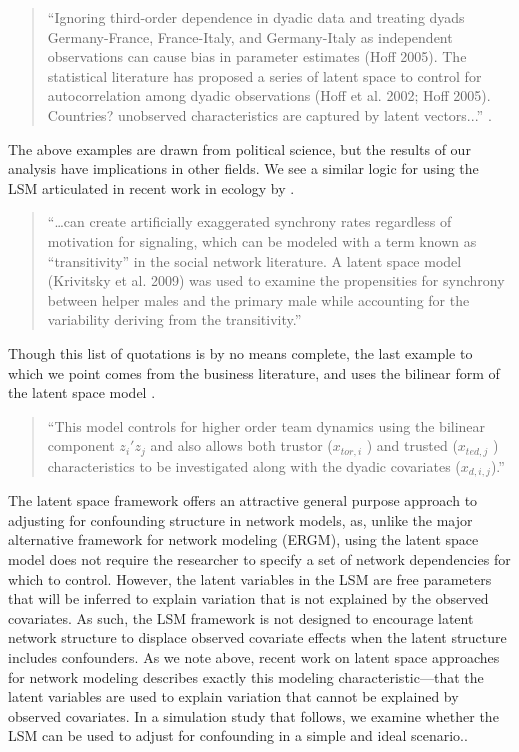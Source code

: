 \documentclass[11pt]{article}
\begin{document}
\begin{quote}
``Ignoring third-order dependence in dyadic data and treating dyads Germany-France, France-Italy, and Germany-Italy as independent observations can cause bias in parameter estimates (Hoff 2005). The statistical literature has proposed a series of latent space to control for autocorrelation among dyadic observations (Hoff et al. 2002; Hoff 2005). Countries? unobserved characteristics are captured by latent vectors...'' \citep[p. 17]{cao2016transnational}.
\end{quote}


The above examples are drawn from political science, but the results of our analysis have implications in other fields. We see a similar logic for using the LSM articulated in recent work in ecology by \citet[p. 989]{nomano2015unrelated}.

\begin{quote}
``\ldots can create artificially exaggerated synchrony rates regardless of motivation for signaling, which can be modeled with a term known as ``transitivity'' in the social network literature. A latent space model (Krivitsky et al. 2009) was used to examine the propensities for synchrony between helper males and the primary male while accounting for the variability deriving from the transitivity.''
\end{quote}


Though this list of quotations is by no means complete, the last example to which we point comes from the business literature, and uses the bilinear form of the latent space model \citep[p. 7]{dass2011impact}. 

\begin{quote}
``This model controls for higher order team dynamics using the bilinear component $z_i'z_j$ and also allows
both trustor ($x_{tor,i}$ ) and trusted ($x_{ted,j}$ ) characteristics to be investigated along with the dyadic covariates ($x_{d,i,j}$).''
\end{quote}


The latent space framework offers an attractive general purpose approach to adjusting for confounding structure in network models, as, unlike the major alternative framework for network modeling (ERGM), using the latent space model does not require the researcher to specify a set of network dependencies for which to control.  However,  the latent variables in the LSM are free parameters that will be inferred to explain variation that is not explained by the observed covariates. As such, the LSM framework is not designed to encourage latent network structure to displace observed covariate effects when the latent structure includes confounders. As we note above, recent work on latent space approaches for network modeling describes exactly this modeling characteristic---that the latent variables are used to explain variation that cannot be explained by observed covariates. In a simulation study that follows, we examine whether the LSM can be used to adjust for confounding in a simple and ideal scenario..
\end{document}
